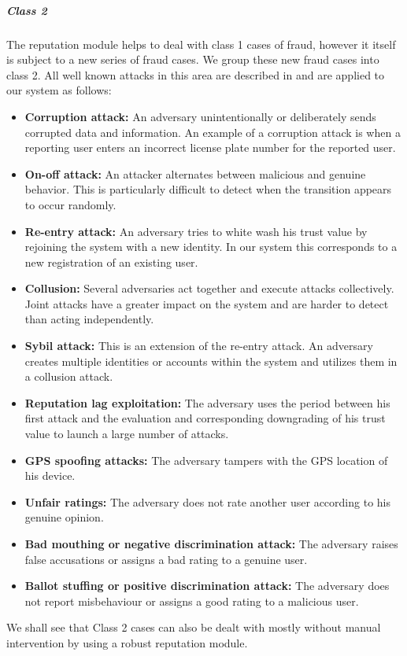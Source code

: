\documentclass[
a4paper,     %
titlepage,   %
14pt         %
]{scrartcl}  %
\theoremstyle{mystyle}
\begin{document}
\subparagraph{Class 2} The reputation module helps to deal with class 1 cases of fraud, however it itself is subject to a new series of fraud cases. We group these new fraud cases into class 2. All well known attacks in this area are described in \cite{mousa2015trust} and are applied to our system as follows:
\begin{itemize}
\item \textbf{Corruption attack:} An adversary unintentionally or deliberately sends corrupted data and information. An example of a corruption attack is when a reporting user enters an incorrect license plate number for the reported user.
\item \textbf{On-off attack:} An attacker alternates between malicious and genuine behavior. This is particularly difficult to detect when the transition appears to occur randomly.
\item \textbf{Re-entry attack:} An adversary tries to white wash his trust value by rejoining the system with a new identity. In our system this corresponds to a new registration of an existing user.
\item \textbf{Collusion:} Several adversaries act together and execute attacks collectively. Joint attacks have a greater impact on the system and are harder to detect than acting independently.
\item \textbf{Sybil attack:} This is an extension of the re-entry attack. An adversary creates multiple identities or accounts within the system and utilizes them in a collusion attack.
\item \textbf{Reputation lag exploitation:} The adversary uses the period between his first attack and the evaluation and corresponding downgrading of his trust value to launch a large number of attacks.
\item \textbf{GPS spoofing attacks:} The adversary tampers with the GPS location of his device.
\item \textbf{Unfair ratings:} The adversary does not rate another user according to his genuine opinion.
\item \textbf{Bad mouthing or negative discrimination attack:} The adversary raises false accusations or assigns a bad rating to a genuine user.
\item \textbf{Ballot stuffing or positive discrimination attack:} The adversary does not report misbehaviour or assigns a good rating to a malicious user.
\end{itemize}
We shall see that Class 2 cases can also be dealt with mostly without manual intervention by using a robust reputation module. 
\end{document}
